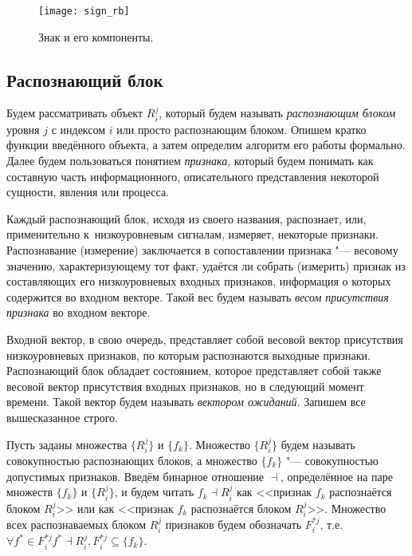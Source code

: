 \begin{figure}[h]
	\centering
    \texttt{[image: sign\_rb]}
    \caption{Знак и его компоненты.}
    \label{fg:sign_rb}
\end{figure}

\subsection{Распознающий блок} \label{sect:recogn_block}
Будем рассматривать объект $R_i^j$, который будем называть \textit{распознающим блоком} уровня $j$ с индексом $i$ или просто распознающим блоком. Опишем кратко функции введённого объекта, а затем определим алгоритм его работы формально.  Далее будем пользоваться понятием \textit{признака}, который будем понимать как составную часть информационного, описательного представления некоторой сущности, явления или процесса.

Каждый распознающий блок, исходя из своего названия, распознает, или, применительно к~низкоуровневым сигналам, измеряет, некоторые признаки.  Распознавание (измерение) заключается в сопоставлении признака "--- весовому значению, характеризующему тот факт, удаётся ли собрать (измерить) признак из составляющих его низкоуровневых входных признаков, информация о которых содержится во входном векторе. Такой вес будем называть \textit{весом присутствия признака} во входном векторе.

Входной вектор, в свою очередь, представляет собой весовой вектор присутствия низкоуровневых признаков, по которым распознаются выходные признаки. Распознающий блок обладает состоянием, которое представляет собой также весовой вектор присутствия входных признаков, но в следующий момент времени. Такой вектор будем называть \textit{вектором ожиданий}. Запишем все вышесказанное строго.

Пусть заданы множества $\{R_i^j\}$ и $\{f_k\}$. Множество $\{R_i^j\}$ будем называть совокупностью распознающих блоков, а множество $\{f_k\}$ "--- совокупностью допустимых признаков. Введём бинарное отношение $\dashv$, определённое на паре множеств $\{f_k\}$ и $\{R_i^j\}$, и будем читать $f_k{\dashv}R_i^j$ как <<признак $f_k$ распознаётся блоком $R_i^j$>> или как <<признак $f_k$ распознаётся блоком $R_i^j$>>. Множество всех распознаваемых блоком $R_i^j$ признаков будем обозначать $F_i^{*j}$, т.е. ${\forall}f^*{\in}F_i^{*j} f^*{\dashv}R_i^j, F_i^{*j}{\subseteq}\{f_k\}$.

